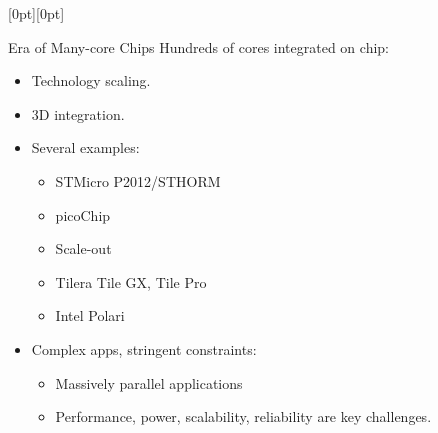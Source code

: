\documentclass[a1paper,portrait]{baposter}
\begin{document}
\begin{poster}
{}
{
  \raisebox{-0.25\headerheight}[0pt][0pt]{%
    }
}


\begin{posterbox}[name=intro,column=0,row=0]{Era of Many-core Chips}
Hundreds of cores integrated on chip:
\begin{itemize}
  \item Technology scaling.
  \item 3D integration.
  \item Several examples:
  \begin{itemize}
      \item STMicro P2012/STHORM 
      \item picoChip 
      \item Scale-out
      
      \item Tilera Tile GX, Tile Pro 
      \item Intel Polari 
  \end{itemize}
  \item Complex apps, stringent constraints:
  \begin{itemize}
      \item Massively parallel applications
      \item Performance, power, scalability, reliability are key challenges.
  \end{itemize}
\end{itemize}


\end{posterbox}
\end{poster}
\end{document}
